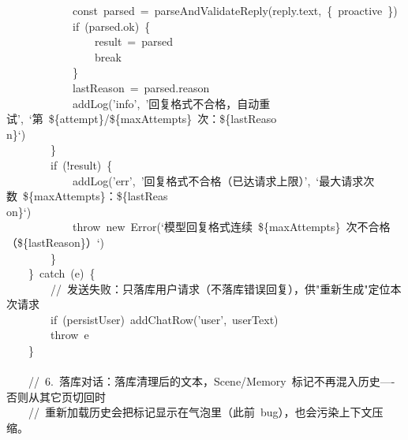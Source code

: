 \documentclass[a4paper,10pt]{article}
\begin{document}
{~~~~~~~~~~~~const~parsed~=~parseAndValidateReply(reply.text,~\{~proactive~\})\\
~~~~~~~~~~~~if~(parsed.ok)~\{\\
~~~~~~~~~~~~~~~~result~=~parsed\\
~~~~~~~~~~~~~~~~break\\
~~~~~~~~~~~~\}\\
~~~~~~~~~~~~lastReason~=~parsed.reason\\
~~~~~~~~~~~~addLog('info',~'回复格式不合格，自动重试',~`第~\$\{attempt\}/\$\{maxAttempts\}~次：\$\{lastReaso\\
n\}`)\\
~~~~~~~~\}\\
~~~~~~~~if~(!result)~\{\\
~~~~~~~~~~~~addLog('err',~'回复格式不合格（已达请求上限）',~`最大请求次数~\$\{maxAttempts\}：\$\{lastReas\\
on\}`)\\
~~~~~~~~~~~~throw~new~Error(`模型回复格式连续~\$\{maxAttempts\}~次不合格（\$\{lastReason\}）`)\\
~~~~~~~~\}\\
~~~~\}~catch~(e)~\{\\
~~~~~~~~//~发送失败：只落库用户请求（不落库错误回复），供"重新生成"定位本次请求\\
~~~~~~~~if~(persistUser)~addChatRow('user',~userText)\\
~~~~~~~~throw~e\\
~~~~\}\\
\mbox{}\\
~~~~//~6.~落库对话：落库清理后的文本，Scene/Memory~标记不再混入历史----否则从其它页切回时\\
~~~~//~重新加载历史会把标记显示在气泡里（此前~bug），也会污染上下文压缩。
}

\newpage
\end{document}

